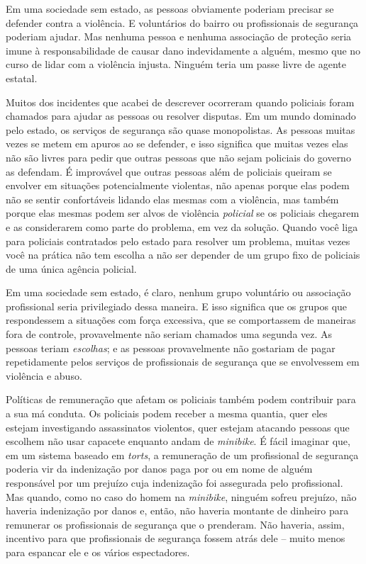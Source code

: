 Em uma sociedade sem estado, as pessoas obviamente poderiam precisar se defender contra a violência. E voluntários do bairro ou profissionais de segurança poderiam ajudar. Mas nenhuma pessoa e nenhuma associação de proteção seria imune à responsabilidade de causar dano indevidamente a alguém, mesmo que no curso de lidar com a violência injusta. Ninguém teria um passe livre de agente estatal.

Muitos dos incidentes que acabei de descrever ocorreram quando policiais foram chamados para ajudar as pessoas ou resolver disputas. Em um mundo dominado pelo estado, os serviços de segurança são quase monopolistas. As pessoas muitas vezes se metem em apuros ao se defender, e isso significa que muitas vezes elas não são livres para pedir que outras pessoas que não sejam policiais do governo as defendam. É improvável que outras pessoas além de policiais queiram se envolver em situações potencialmente violentas, não apenas porque elas podem não se sentir confortáveis lidando elas mesmas com a violência, mas também porque elas mesmas podem ser alvos de violência \emph{policial} se os policiais chegarem e as considerarem como parte do problema, em vez da solução. Quando você liga para policiais contratados pelo estado para resolver um problema, muitas vezes você na prática não tem escolha a não ser depender de um grupo fixo de policiais de uma única agência policial. 

Em uma sociedade sem estado, é claro, nenhum grupo voluntário ou associação profissional seria privilegiado dessa maneira. E isso significa que os grupos que respondessem a situações com força excessiva, que se comportassem de maneiras fora de controle, provavelmente não seriam chamados uma segunda vez. As pessoas teriam \emph{escolhas}; e as pessoas provavelmente não gostariam de pagar repetidamente pelos serviços de profissionais de segurança que se envolvessem em violência e abuso.

Políticas de remuneração que afetam os policiais também podem contribuir para a sua má conduta. Os policiais podem receber a mesma quantia, quer eles estejam investigando assassinatos violentos, quer estejam atacando pessoas que escolhem não usar capacete enquanto andam de \emph{minibike}. É fácil imaginar que, em um sistema baseado em \emph{torts}, a remuneração de um profissional de segurança poderia vir da indenização por danos paga por ou em nome de alguém responsável por um prejuízo cuja indenização foi assegurada pelo profissional. Mas quando, como no caso do homem na \emph{minibike}, ninguém sofreu prejuízo, não haveria indenização por danos e, então, não haveria montante de dinheiro para remunerar os profissionais de segurança que o prenderam. Não haveria, assim, incentivo para que profissionais de segurança fossem atrás dele -- muito menos para espancar ele e os vários espectadores.

